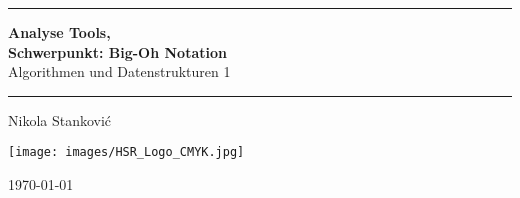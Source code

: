 \documentclass[a4paper,12pt]{scrartcl}
\newcommand{\documenttitel}{Analyse Tools}
\newcommand{\documentsubtitel}{Algorithmen und Datenstrukturen 1}
\newcommand{\documentauthors}{Nikola Stanković}
\newcommand\HRule{\noindent\rule{\linewidth}{2pt}}
\begin{document}
\author{
  Stanković, Nikola
}

\begin{titlepage}
	\HRule
	\vspace*{5pt}
	\begin{flushright}
	{\Huge \textbf{\documenttitel, \\ Schwerpunkt: Big-Oh Notation} \\ \vspace*{12.5pt} \Large \documentsubtitel}
	\end{flushright}
	\vspace*{5pt}
	\HRule
	\begin{flushright}
	\vspace{20pt}
	\LARGE
	\documentauthors
	\end{flushright}
	
	\vfill	
	
	\begin{center}
		\texttt{[image: images/HSR\_Logo\_CMYK.jpg]}\par\vspace{1cm}
		{\large \today \par}
	\end{center}
\end{titlepage}

\tableofcontents
\newpage








\newpage
\printglossaries
\end{document}
